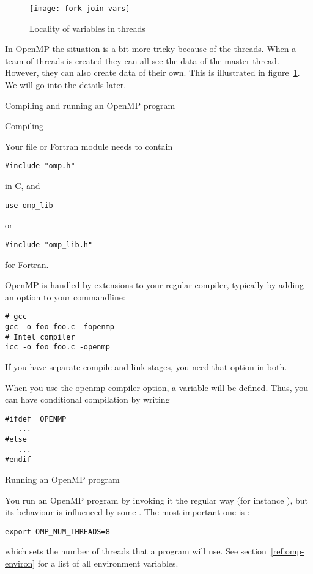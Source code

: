 \begin{figure}[ht]
\texttt{[image: fork-join-vars]}
\caption{Locality of variables in threads}
\label{fig:threadvars}
\end{figure}
%
In OpenMP the situation is a bit more tricky because of the threads.
When a team of threads is created they can all see the data of the
master thread. However, they can also create data of their own.
This is illustrated in figure~\ref{fig:threadvars}.
We will go into the details later.

 {Compiling and running an OpenMP program}

 {Compiling}

Your file or Fortran module needs to contain
\begin{lstlisting}
#include "omp.h"
\end{lstlisting}
in C, and 
\begin{lstlisting}
use omp_lib
\end{lstlisting}
or
\begin{lstlisting}
#include "omp_lib.h"
\end{lstlisting}
for Fortran.

OpenMP is handled by extensions to your regular compiler, typically by
adding an option to your commandline:
\begin{verbatim}
# gcc
gcc -o foo foo.c -fopenmp
# Intel compiler
icc -o foo foo.c -openmp
\end{verbatim}
If you have separate compile and link stages, you need that option in both.

When you use the openmp compiler option, a  variable 
will be defined. Thus, you can have conditional compilation by writing
\begin{lstlisting}
#ifdef _OPENMP
   ...
#else
   ...
#endif
\end{lstlisting}


 {Running an OpenMP program}

You run an OpenMP program by invoking it the regular way (for instance ),
but its behaviour is influenced by some .
The most important one is :
\begin{verbatim}
export OMP_NUM_THREADS=8
\end{verbatim}
which sets the number of threads that a program will use.
See section~\ref{ref:omp-environ} for a list of all environment variables.

